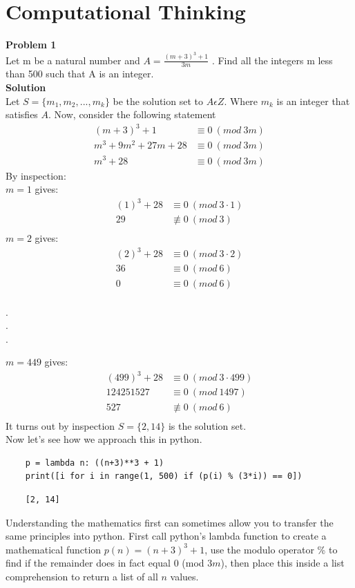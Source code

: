 \documentclass[11pt]{article}
\begin{document}
\section{Computational Thinking}
\textbf{Problem 1}\\
Let m be a natural number and $A = \frac{(m + 3)^3 + 1}{3m}$ . Find all the integers m less than 500 such that A is an integer.\\

\textbf{Solution}\\
Let $S = \{m_1, m_2, . . . , m_k\}$ be the solution set to $A \epsilon Z$. Where $m_k$ is an integer that satisfies $A$. Now, consider the following statement
\begin{align*}
(m+3)^3+1 &\equiv0~(mod~3m) \\ 
m^3+9m^2+27m+28 &\equiv0~(mod~3m) \\
m^3 + 28 &\equiv0~(mod~3m)
\end{align*}
By inspection:\\
$m=1$ gives:
\begin{align*}
(1)^3 + 28 &\equiv0~(mod~3\cdot1)\\
29 &\not\equiv0~(mod~3)\\
\end{align*}
$m=2$ gives:
\begin{align*}
(2)^3 + 28 &\equiv0~(mod~3\cdot2)\\
36 &\equiv0~(mod~6)\\
0 &\equiv0~(mod~6)\\
\end{align*}
\begin{center}
.\\
.\\
.\\    
\end{center}
$m = 449$ gives:
\begin{align*}
(499)^3 + 28 &\equiv0~(mod~3\cdot499)\\
124251527 &\equiv0~(mod~1497)\\
527 &\not\equiv0~(mod~6)\\
\end{align*}
It turns out by inspection $S = \{2, 14\}$ is the solution set.\\
Now let's see how we approach this in python.
\begin{verbatim}
    p = lambda n: ((n+3)**3 + 1)
    print([i for i in range(1, 500) if (p(i) % (3*i)) == 0])
\end{verbatim}
\begin{verbatim}
    [2, 14]
\end{verbatim}
Understanding the mathematics first can sometimes allow you to transfer the same principles into python. First call python's lambda function to create a mathematical function $p(n) = (n+3)^3 + 1$, use the modulo operator \% to find if the remainder does in fact equal $0$ (mod $3m$), then place this inside a list comprehension to return a list of all $n$ values.
\end{document}
